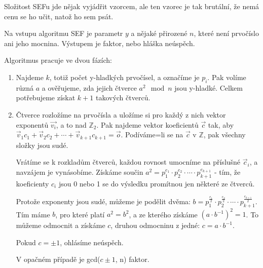 Složitost SEFu jde nějak vyjádřit vzorcem, ale ten vzorec je tak brutální, že
nemá cenu se ho učit, natož ho sem psát.

Na vstupu algoritmu SEF je parametr $y$ a nějaké přirozené $n$, které není
prvočíslo ani jeho mocnina. Výstupem je faktor, nebo hláška neúspěch. 

Algoritmus pracuje ve dvou fázích:

\begin{enumerate}
\item Najdeme $k$, totiž počet y-hladkých prvočísel, a označíme je $p_i$. Pak
volíme různá $a$ a ověřujeme, zda jejich čtverce $a^2 \mod n$ jsou y-hladké. Celkem
potřebujeme získat $k+1$ takových čtverců.
\item Čtverce rozložíme na prvočísla a uložíme si pro každý z nich vektor
exponentů $\vec{v_i}$, a to nad $\mathbb{Z}_2$. Pak najdeme vektor koeficientů
$\vec{c}$ tak, aby $\vec{v}_1c_1 + \vec{v}_2c_2  + \cdots + \vec{v}_{k+1}c_{k+1}
= \vec{o}$. Podíváme=li se na $\vec{c}$ v  $\mathbb{Z}$, pak všechny složky jsou
sudé. 

Vrátíme se k rozkladům čtverců, každou rovnost umocníme na příslušné
$\vec{c}_i$, a navzájem je vynásobíme. Získáme součin $a^2 = p_1^{e_1} \cdot
p_2^{e_2} \cdot \cdots \cdot p_{k+1}^{e_{k+1}}$ - tím, že koeficienty $c_i$ jsou
0 nebo 1 se do výsledku promítnou jen některé ze čtverců.

Protože exponenty jsou sudé, můžeme je podělit dvěma: $b = p_1^{\frac{e_1}{2}}
\cdot p_2^{\frac{e_2}{2}} \cdot \cdots \cdot p_{k+1}^{\frac{e_{k+1}}{2}}$. Tím
máme $b$, pro které platí $a^2 = b^2$, a ze kterého získáme $(a\cdot b^{-1})^2 =
1$. To můžeme odmocnit a získáme $c$, druhou odmocninu z jedné: $c = a\cdot
b^{-1}$.

Pokud $c = \pm 1$, ohlásíme neúspěch.

V opačném případě je gcd($c \pm 1$, n) faktor.
\end{enumerate}


